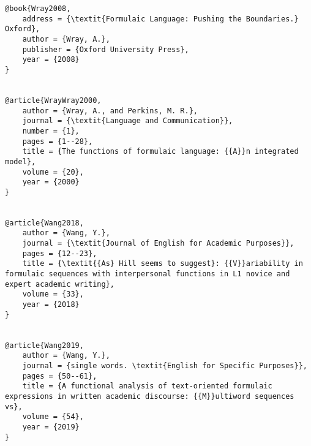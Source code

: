 \documentclass[output=paper]{langsci/langscibook}
\begin{document}
\begin{verbatim}
@book{Wray2008,
	address = {\textit{Formulaic Language: Pushing the Boundaries.} Oxford},
	author = {Wray, A.},
	publisher = {Oxford University Press},
	year = {2008}
}


@article{WrayWray2000,
	author = {Wray, A., and Perkins, M. R.},
	journal = {\textit{Language and Communication}},
	number = {1},
	pages = {1--28},
	title = {The functions of formulaic language: {{A}}n integrated model},
	volume = {20},
	year = {2000}
}


@article{Wang2018,
	author = {Wang, Y.},
	journal = {\textit{Journal of English for Academic Purposes}},
	pages = {12--23},
	title = {\textit{{As} Hill seems to suggest}: {{V}}ariability in formulaic sequences with interpersonal functions in L1 novice and expert academic writing},
	volume = {33},
	year = {2018}
}


@article{Wang2019,
	author = {Wang, Y.},
	journal = {single words. \textit{English for Specific Purposes}},
	pages = {50--61},
	title = {A functional analysis of text-oriented formulaic expressions in written academic discourse: {{M}}ultiword sequences vs},
	volume = {54},
	year = {2019}
}


\end{verbatim}
\sloppy\printbibliography[heading=subbibliography,notkeyword=this]
\end{document}
